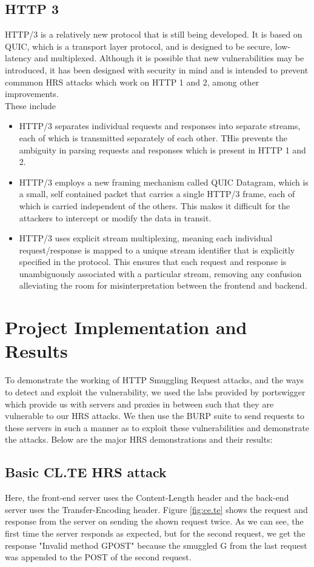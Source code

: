 \documentclass[conference]{IEEEtran}
\begin{document}
\subsection*{HTTP 3}
HTTP/3 is a relatively new protocol that is still being developed. It is based on QUIC, which is a transport layer protocol, and is designed to be secure, low-latency and multiplexed. Although it is possible that new vulnerabilities may be introduced, it has been designed with security in mind and is intended to prevent commmon HRS attacks which work on HTTP 1 and 2, among other improvements. \\
These include
\begin{itemize}
	\item HTTP/3 separates individual requests and responses into separate streams, each of which is transmitted separately of each other. THis prevents the ambiguity in parsing requests and responses which is present in HTTP 1 and 2.
	\item HTTP/3 employs a new framing mechanism called QUIC Datagram, which is a small, self contained packet that carries a single HTTP/3 frame, each of which is carried independent of the others. This makes it difficult for the attackers to intercept or modify the data in transit.
	\item HTTP/3 uses explicit stream multiplexing, meaning each individual request/response is mapped to a unique stream identifier that is explicitly specified in the protocol. This ensures that each request and response is unambiguously associated with a particular stream, removing any confusion alleviating the room for misinterpretation between the frontend and backend.
\end{itemize}


\section{Project Implementation and Results}
To demonstrate the working of HTTP Smuggling Request attacks, and the ways to detect and exploit the vulnerability, we used the labs provided by portswigger which provide us with servers and proxies in between such that they are vulnerable to our HRS attacks. We then use the BURP suite to send requests to these servers in such a manner as to exploit these vulnerabilities and demonstrate the attacks. Below are the major HRS demonstrations and their results:

\subsection*{Basic CL.TE HRS attack}
Here, the front-end server uses the Content-Length header and the back-end server uses the Transfer-Encoding header. Figure \ref*{fig:ce.te} shows the request and response from the server on sending the shown request twice. As we can see, the first time the server responds as expected, but for the second request, we get the response "Invalid method GPOST" because the smuggled G from the last request was appended to the POST of the second request.
\end{document}
